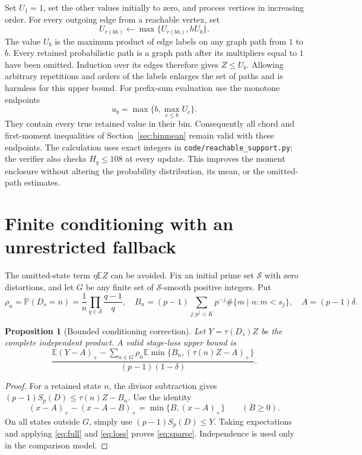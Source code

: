 \documentclass[11pt]{article}
\newtheorem{proposition}[theorem]{Proposition}
\newcommand{\E}{\mathbb E}
\newcommand{\Pp}{\mathbb P}
\begin{document}
Set $U_1=1$, set the other values initially to zero, and process vertices
in increasing order. For every outgoing edge from a reachable vertex, set
\[
 U_{r(bh)}\leftarrow\max\{U_{r(bh)},hU_b\}.
\]
The value $U_b$ is the maximum product of edge labels on any graph path
from $1$ to $b$. Every retained probabilistic path is a graph path after
its multipliers equal to $1$ have been omitted. Induction over its edges
therefore gives $Z\leq U_b$. Allowing arbitrary repetitions and orders of
the labels enlarges the set of paths and is harmless for this upper bound.
For prefix-sum evaluation use the monotone endpoints
\[
 u_b=\max\{b,\max_{c\leq b}U_c\}.
\]
They contain every true retained value in their bin. Consequently all
chord and first-moment inequalities of Section~\ref{sec:binmean} remain
valid with these endpoints. The calculation uses exact integers in
\texttt{code/reachable\_support.py}; the verifier also checks $H_q\leq108$
at every update. This improves the moment enclosure without altering the
probability distribution, its mean, or the omitted-path estimates.

\section{Finite conditioning with an unrestricted fallback}\label{sec:sparse}
The omitted-state term $\eta\E Z$ can be avoided. Fix an initial prime
set $\mathcal S$ with zero distortions, and let $G$ be any finite set of
$\mathcal S$-smooth positive integers. Put
\[
 \rho_n=\Pp(D_s=n)=\frac1n\prod_{q\in\mathcal S}\frac{q-1}{q},\quad
 B_n=(p-1)\sum_{j:p^j<K}p^{-j}\#\{m\mid n:m<s_j\},\quad A=(p-1)\delta.
\]
\begin{proposition}[Bounded conditioning correction]\label{prop:sparse}
Let $Y=\tau(D_s)Z$ be the complete independent product. A valid stage-loss
upper bound is
\begin{equation}\label{eq:sparse}
 \frac{\displaystyle \E(Y-A)_+
 -\sum_{n\in G}\rho_n\E\min\{B_n,(\tau(n)Z-A)_+\}}
 {(p-1)(1-\delta)}.
\end{equation}
\end{proposition}
\begin{proof}
For a retained state $n$, the divisor subtraction gives
$(p-1)S_p(D)\leq\tau(n)Z-B_n$. Use the identity
\[
 (x-A)_+-(x-A-B)_+=\min\{B,(x-A)_+\}\qquad(B\geq0).
\]
On all states outside $G$, simply use $(p-1)S_p(D)\leq Y$.
Taking expectations and applying \eqref{eq:full} and \eqref{eq:loss}
proves \eqref{eq:sparse}. Independence is used only in the comparison model.
\end{proof}
\end{document}

